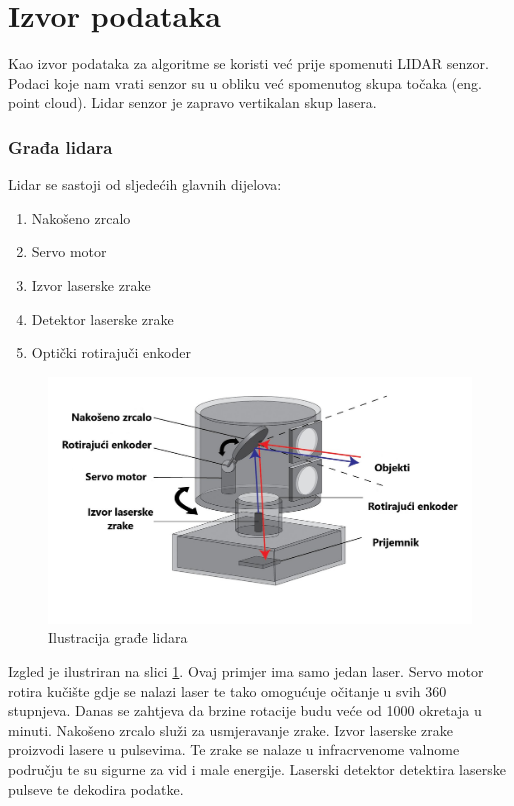 \pagebreak
\section{Izvor podataka}
Kao izvor podataka za algoritme se koristi već prije spomenuti LIDAR senzor. Podaci koje nam vrati senzor su u obliku već spomenutog skupa točaka (eng. point cloud). Lidar senzor je zapravo vertikalan skup lasera.

\subsubsection{Građa lidara}

Lidar se sastoji od sljedećih glavnih dijelova:
\begin{enumerate}
  \item Nakošeno zrcalo
  \item Servo motor
  \item Izvor laserske zrake
  \item Detektor laserske zrake
  \item Optički rotirajuči enkoder
\end{enumerate}


\begin{figure}[ht!]
  \centering
  \includegraphics[scale=0.4]{images/lidar_arch.jpg}
  \caption{Ilustracija građe lidara}
  \label{fig:lidar_arch}
\end{figure}


Izgled je ilustriran na slici \ref{fig:lidar_arch}. Ovaj primjer ima samo jedan laser. Servo motor rotira kučište gdje se nalazi laser te tako omogućuje očitanje u svih 360 stupnjeva. Danas se zahtjeva da brzine rotacije budu veće od 1000 okretaja u minuti. Nakošeno zrcalo služi za usmjeravanje zrake. Izvor laserske zrake proizvodi lasere u pulsevima. Te zrake se nalaze u infracrvenome valnome području te su sigurne za vid i male energije. Laserski detektor detektira laserske pulseve te dekodira podatke.

